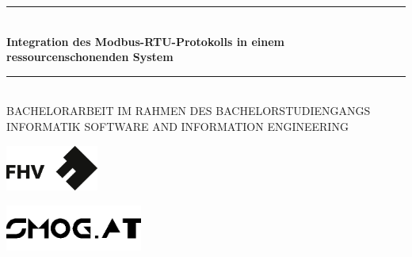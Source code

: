 
\begin{titlepage}




\begin{center}


\newcommand{\HRule}{\rule{\linewidth}{0.5mm}}
\HRule \\[0.4cm]
{ \huge \bfseries Integration des Modbus-RTU-Protokolls in einem ressourcenschonenden System}\\ [0.4cm]%
\HRule \\[1cm]

\textsc{\large BACHELORARBEIT IM RAHMEN DES
BACHELORSTUDIENGANGS INFORMATIK
SOFTWARE AND INFORMATION ENGINEERING}\\[3cm]



\begin{minipage}{0.48\textwidth}
\begin{center} 
\includegraphics[height=1.5cm]{./img/FHVlogo1}
\end{center}
\end{minipage}
\hfill
\begin{minipage}{0.48\textwidth}
\begin{center} 
\includegraphics[height=1.5cm]{./img/logo-smog1.png}


\end{center}
\end{minipage}
\end{center}
\end{titlepage}

